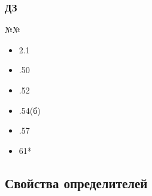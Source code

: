 \documentclass{article}
\begin{document}
\subsubsection{ДЗ}

№№
\begin{itemize}
\item{2.1}
\item{.50}
\item{.52}
\item{.54(б)}
\item{.57}
\item{61*}
\end{itemize}

\subsection{Свойства определителей}
\end{document}
